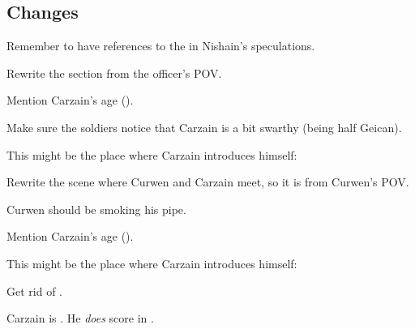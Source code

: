 \subsection{Changes}
\begin{changes}
    
  \begin{comment}
  \paragraph{War is Coming}
  \end{comment}
    Remember to have references to the  in Nishain's speculations. 
    
    Rewrite the  section from the officer's POV. 
    
    Mention Carzain's age (). 
    
    Make sure the soldiers notice that Carzain is a bit swarthy (being half Geican). 
    
    This might be the place where Carzain introduces himself:

  \begin{comment}
  \paragraph{To \Malcur}
  \end{comment}
    Rewrite the scene where Curwen and Carzain meet, so it is from Curwen's POV. 
    
    Curwen should be smoking his pipe. 
    
    Mention Carzain's age (). 
    
    This might be the place where Carzain introduces himself:
  
  \begin{comment}\paragraph{\Forklin}\end{comment}
  \changesitem{\Forklin} 
    Get rid of \Racel. 
    
    Carzain is . 
    He \emph{does} score in \Forklin.  
  

\end{changes}
